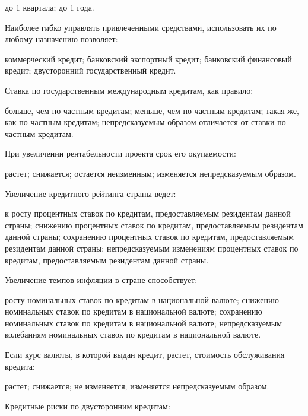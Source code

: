 \documentclass[12pt, table]{exam}
\begin{document}
\begin{questions}
\begin{multicols}{2}
\begin{choices}
	 \choice до 1 квартала;
	 \choice до 1 года.
	 \end{choices}
\question Наиболее гибко управлять привлеченными средствами, использовать их по любому назначению позволяет:
	 \begin{choices}
	 \CC коммерческий кредит;
	 \choice банковский экспортный кредит;
	 \choice банковский финансовый кредит;
	 \choice двусторонний государственный кредит.
	 \end{choices}
\question Ставка по государственным международным кредитам, как правило:
	 \begin{choices}
	 \CC больше, чем по частным кредитам;
	 \choice меньше, чем по частным кредитам;
	 \choice такая же, как по частным кредитам;
	 \choice непредсказуемым образом отличается от ставки по частным кредитам.
	 \end{choices}
\question При увеличении рентабельности проекта срок его окупаемости:
	 \begin{choices}
	 \choice растет;
	 \CC снижается;
	 \choice остается неизменным;
	 \choice изменяется непредсказуемым образом.
	 \end{choices}
\question Увеличение кредитного рейтинга страны ведет:
	 \begin{choices}
	 \choice к росту процентных ставок по кредитам, предоставляемым резидентам данной страны;
	 \CC снижению процентных ставок по кредитам, предоставляемым резидентам данной страны;
	 \choice сохранению процентных ставок по кредитам, предоставляемым резидентам данной страны;
	 \choice непредсказуемым изменениям процентных ставок по кредитам, предоставляемым резидентам данной страны.
	 \end{choices}
\question Увеличение темпов инфляции в стране способствует:
	 \begin{choices}
	 \CC росту номинальных ставок по кредитам в национальной валюте;
	 \choice снижению номинальных ставок по кредитам в национальной валюте;
	 \choice сохранению номинальных ставок по кредитам в национальной валюте;
	 \choice непредсказуемым колебаниям номинальных ставок по кредитам в национальной валюте.
	 \end{choices}
\question Если курс валюты, в которой выдан кредит, растет, стоимость обслуживания кредита:
	 \begin{choices}
	 \choice растет;
	 \choice снижается;
	 \CC не изменяется;
	 \choice изменяется непредсказуемым образом.
	 \end{choices}
\question Кредитные риски по двусторонним кредитам:
	 \begin{choices}

\end{choices}
\end{multicols}
\end{questions}
\end{document}
